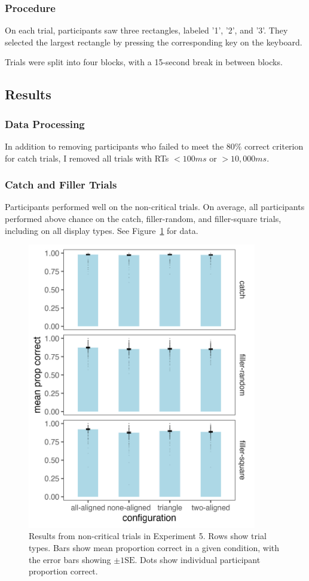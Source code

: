 \subsubsection{Procedure}
On each trial, participants saw three rectangles, labeled '1', '2', and '3'. They selected the largest rectangle by pressing the corresponding key on the keyboard. 

Trials were split into four blocks, with a 15-second break in between blocks.

\subsection{Results}

\subsubsection{Data Processing}
In addition to removing participants who failed to meet the $80\%$ correct criterion for catch trials, I removed all trials with RTs $<100ms$ or $>10,000ms$. 

\subsubsection{Catch and Filler Trials}
Participants performed well on the non-critical trials. On average, all participants performed above chance on the catch, filler-random, and filler-square trials, including on all display types. See Figure~\ref{fig:comparability_non_crit_mean_prop_correct} for data.

\begin{figure}
   \includegraphics[width=100mm]{figures/comparability_non_crit_mean_prop_correct.jpeg}
   \caption{Results from non-critical trials in Experiment 5. Rows show trial types. Bars show mean proportion correct in a given condition, with the error bars showing $\pm1\text{SE}$. Dots show individual participant proportion correct.}
   \label{fig:comparability_non_crit_mean_prop_correct}
\end{figure}

